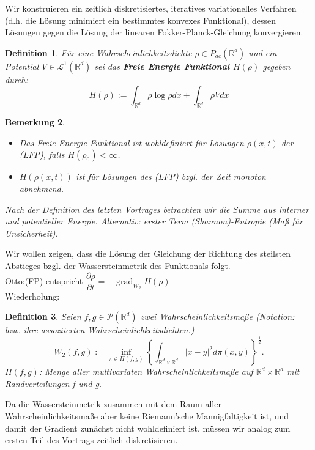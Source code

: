 \documentclass[11pt,a4paper,notitlepage]{scrreprt}
\newcommand{\RR}{\mathbb{R}}
\newcommand{\grad}{\operatorname{grad}}
\newtheorem{defi}{Definition}[section]
\newtheorem{bem}[defi]{Bemerkung}
\begin{document}
Wir konstruieren ein zeitlich diskretisiertes, iteratives variationelles Verfahren (d.h. die Lösung minimiert ein bestimmtes konvexes Funktional), dessen Lösungen gegen die Lösung der linearen Fokker-Planck-Gleichung konvergieren.

\begin{defi}
Für eine Wahrscheinlichkeitsdichte $\rho\in P_{ac}(\RR^d)$ und ein Potential $V\in\mathcal{L}^1(\RR^d)$ sei das \textbf{Freie Energie Funktional $H(\rho)$} gegeben durch:
\begin{equation}
H(\rho):=\int_{\RR^d} \rho\log\rho dx + \int_{\RR^d}\rho V dx \label{FEFktn}
\end{equation}
\end{defi}

\begin{bem}
\begin{itemize}
\item Das Freie Energie Funktional ist wohldefiniert für Lösungen $\rho(x,t)$ der (LFP), falls $H(\rho_0)<\infty$.
\item $H(\rho(x,t))$ ist für Lösungen des (LFP) bzgl. der Zeit monoton abnehmend.\end{itemize}
\item Nach der Definition des letzten Vortrages betrachten wir die Summe aus interner und potentieller Energie. Alternativ: erster Term (Shannon)-Entropie (Maß für Unsicherheit).
\end{bem}

Wir wollen zeigen, dass die Lösung der Gleichung der Richtung des steilsten Abstieges bzgl. der Wassersteinmetrik des Funktionals folgt. \\Otto:(FP) entspricht $\dfrac{\partial\rho}{\partial t} = -\grad_{W_2} H(\rho)$\\

Wiederholung:
\begin{defi}
Seien $f,g\in\mathcal{P}(\RR^d)$ zwei Wahrscheinlichkeitsmaße (Notation: bzw. ihre assoziierten Wahrscheinlichkeitsdichten.)
\begin{equation}
W_2(f,g):=\inf_{\pi \in \Pi(f,g)} \left\{ \int_{\RR^d\times\RR^d} \vert x-y \vert^2 d\pi(x,y)\right\}^\frac{1}{2}.\label{W2}
\end{equation}
$\Pi(f,g)$: Menge aller multivariaten Wahrscheinlichkeitsmaße auf $\RR^d \times \RR^d$ mit Randverteilungen f und g.
\end{defi}
Da die Wassersteinmetrik zusammen mit dem Raum aller Wahrscheinlichkeitsmaße aber keine Riemann'sche Mannigfaltigkeit ist, und damit der Gradient zunächst nicht wohldefiniert ist, müssen wir analog zum ersten Teil des Vortrags zeitlich diskretisieren.\\
\end{document}
